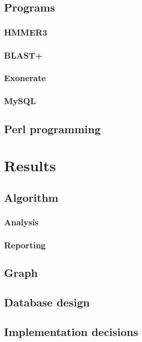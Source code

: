 \documentclass[a4paper,12pt]{scrreprt}
\begin{document}
	\section{Programs}
		
		\subsection{HMMER3}
			
		\subsection{BLAST+}
			
		\subsection{Exonerate}
			
		\subsection{MySQL}
			
	\section{Perl programming}
		

\chapter{Results}
	
	\section{Algorithm}
		\subsection{Analysis}
			
		\subsection{Reporting}
			
	\section{Graph}
		
	\section{Database design}
		
	\section{Implementation decisions}
\end{document}
